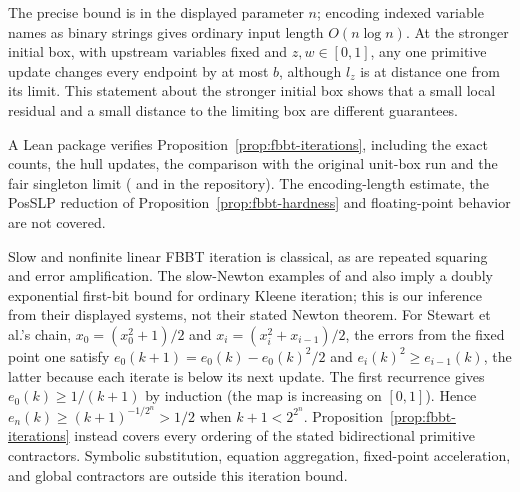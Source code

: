 The precise bound is in the displayed parameter $n$; encoding indexed
variable names as binary strings gives ordinary input length $O(n\log n)$.
At the stronger initial box, with upstream variables fixed and
$z,w\in[0,1]$, any one primitive update changes every endpoint by at most
$b$, although $l_z$ is at distance one from its limit. This statement
about the stronger initial box shows that a small local residual and a
small distance to the limiting box are different guarantees.

A Lean package verifies Proposition~\ref{prop:fbbt-iterations},
including the exact counts, the hull updates, the comparison with the
original unit-box run and the fair singleton limit
( and
 in the repository). The
encoding-length estimate, the PosSLP reduction of
Proposition~\ref{prop:fbbt-hardness} and floating-point behavior are not
covered.

Slow and nonfinite linear FBBT iteration is classical, as are repeated
squaring and error amplification. The slow-Newton examples of
\citet[Section 7, Theorem 7.1]{EsparzaEtAl2010} and
\citet[Section 4.1, equation (18)]{StewartEtAl2015} also imply a doubly
exponential first-bit bound for ordinary Kleene iteration; this is our
inference from their displayed systems, not their stated Newton theorem.
For Stewart et al.'s chain, $x_0=(x_0^2+1)/2$ and
$x_i=(x_i^2+x_{i-1})/2$, the errors from the fixed point one satisfy
$e_0(k+1)=e_0(k)-e_0(k)^2/2$ and $e_i(k)^2\ge e_{i-1}(k)$, the latter
because each iterate is below its next update. The first recurrence gives
$e_0(k)\ge1/(k+1)$ by induction (the map is increasing on $[0,1]$).
Hence $e_n(k)\ge(k+1)^{-1/2^n}>1/2$ when $k+1<2^{2^n}$.
Proposition~\ref{prop:fbbt-iterations} instead covers every ordering of
the stated bidirectional primitive contractors. Symbolic substitution,
equation aggregation, fixed-point acceleration, and global contractors
are outside this iteration bound.
